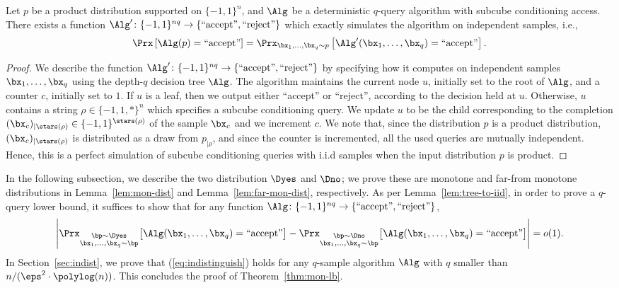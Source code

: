 \begin{lemma}\label{lem:tree-to-iid}
Let $p$ be a product distribution supported on $\{-1,1\}^n$, and $\Alg$ be a deterministic $q$-query algorithm with subcube conditioning access. There exists a function $\Alg' \colon \{-1,1\}^{nq} \to \{ \text{``accept''}, \text{``reject''}\}$ which exactly simulates the algorithm on independent samples, i.e.,
\begin{align*}
\Prx\left[ \Alg(p) = \text{``accept''} \right] = \Prx_{\bx_1,\dots, \bx_q \sim p}\left[ \Alg'(\bx_1,\dots, \bx_q) = \text{``accept''}\right].
\end{align*}
\end{lemma}\begin{proof}
We describe the function $\Alg' \colon \{-1,1\}^{nq} \to \{\text{``accept''}, \text{``reject''} \}$ by specifying how it computes on independent samples $\bx_1, \dots, \bx_q$ using the depth-$q$ decision tree $\Alg$. The algorithm maintains the current node $u$, initially set to the root of $\Alg$, and a counter $c$, initially set to $1$. If $u$ is a leaf, then we output either ``accept'' or ``reject'', according to the decision held at $u$. Otherwise, $u$ contains a string $\rho \in \{-1,1, *\}^n$ which specifies a subcube conditioning query. We update $u$ to be the child corresponding to the completion $(\bx_c)_{|\stars(\rho)} \in \{-1,1\}^{\stars(\rho)}$ of the sample $\bx_c$ and we increment $c$. We note that, since the distribution $p$ is a product distribution, $(\bx_c)_{|\stars(\rho)}$ is distributed as a draw from $p_{|\rho}$, and since the counter is incremented, all the used queries are mutually independent. Hence, this is a perfect simulation of subcube conditioning queries with i.i.d samples when the input distribution $p$ is product.
\end{proof}

In the following subsection, we describe the two distribution $\Dyes$ and $\Dno$; we prove these are monotone and far-from monotone distributions in Lemma~\ref{lem:mon-dist} and Lemma~\ref{lem:far-mon-dist}, respectively. 
As per Lemma~\ref{lem:tree-to-iid}, in order to prove a $q$-query lower bound, it suffices to show that for any function $\Alg \colon \{-1,1\}^{nq} \to \{\text{``accept''}, \text{``reject''} \}$, 
\begin{align}
\left| \Prx_{\substack{\bp \sim \Dyes \\ \bx_1,\dots, \bx_q \sim \bp}}\big[ \Alg(\bx_1,\dots, \bx_q) = \text{``accept''}\big] - \Prx_{\substack{\bp \sim \Dno \\ \bx_1,\dots, \bx_q \sim \bp}}\big[ \Alg(\bx_1,\dots, \bx_q) = \text{``accept''}\big] \right| = o(1). \label{eq:indistinguish}
\end{align}
In Section~\ref{sec:indist}, we prove that (\ref{eq:indistinguish}) holds for any $q$-sample algorithm $\Alg$ with $q$ smaller than $n / (\eps^2\cdot \polylog(n))$. This concludes the proof of Theorem~\ref{thm:mon-lb}.

